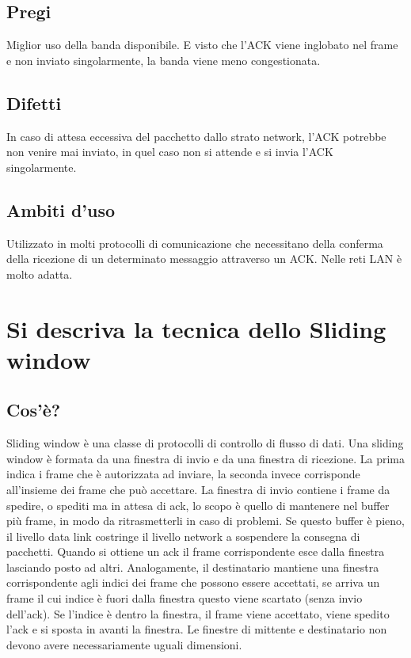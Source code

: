 \subsection{Pregi}
Miglior uso della banda disponibile. E visto che l'ACK viene inglobato nel frame e non inviato singolarmente, la banda viene meno congestionata.

\subsection{Difetti}
In caso di attesa eccessiva del pacchetto dallo strato network, l'ACK potrebbe non venire mai inviato, in quel caso non si attende e si invia l'ACK singolarmente.

\subsection{Ambiti d'uso}
Utilizzato in molti protocolli di comunicazione che necessitano della conferma della ricezione di un determinato messaggio attraverso un ACK. Nelle reti LAN è molto adatta.

\section{Si descriva la tecnica dello Sliding window}
\subsection{Cos'è?}
Sliding window è una classe di protocolli di controllo di flusso di dati.
Una sliding window è formata da una finestra di invio e da una finestra di ricezione.
La prima indica i frame che è autorizzata ad inviare, la seconda invece corrisponde all'insieme dei frame che può accettare.
La finestra di invio contiene i frame da spedire, o spediti ma in attesa di ack, lo scopo è quello di mantenere nel buffer più frame, in modo da ritrasmetterli in caso di problemi. Se questo buffer è pieno, il livello data link costringe il livello network a sospendere la consegna di pacchetti. Quando si ottiene un ack il frame corrispondente esce dalla finestra lasciando posto ad altri.
Analogamente, il destinatario mantiene una finestra corrispondente agli indici dei frame che possono essere accettati, se arriva un frame il cui indice è fuori dalla finestra questo viene scartato (senza invio dell'ack). Se l'indice è dentro la finestra, il frame viene accettato, viene spedito l'ack e si sposta in avanti la finestra.
Le finestre di mittente e destinatario non devono avere necessariamente uguali dimensioni.

